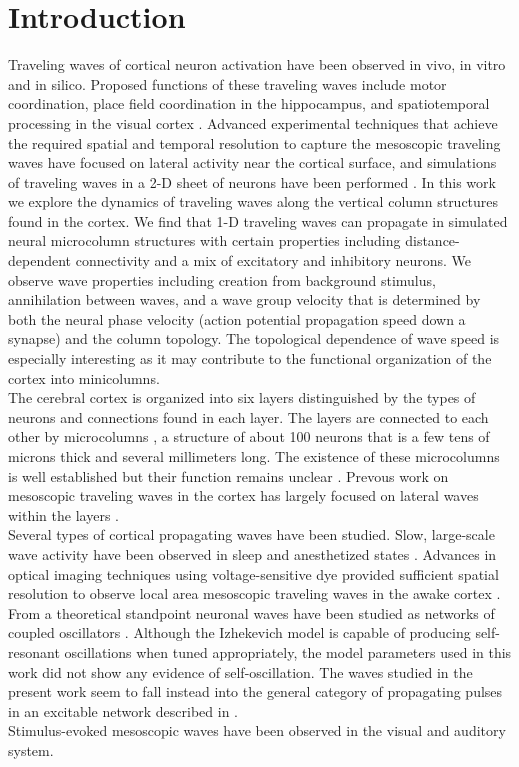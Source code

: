 \documentclass[a4paper,11pt]{article}
\begin{document}
\section{Introduction} 
Traveling waves of cortical neuron activation have been observed in vivo, in vitro and in silico. 
Proposed functions of these traveling waves include motor coordination, place field coordination in the hippocampus, and spatiotemporal processing in the visual cortex \cite{muller2018}. 
Advanced experimental techniques that achieve the required spatial and temporal resolution \cite{shoham1999} to capture the mesoscopic traveling waves have focused on lateral activity near the cortical surface, and simulations of traveling waves in a 2-D sheet of neurons have been performed \cite{keane2015}. 
In this work we explore the dynamics of traveling waves along the vertical column structures found in the cortex.
We find that 1-D traveling waves can propagate in simulated neural microcolumn structures with certain properties including distance-dependent connectivity and a mix of excitatory and inhibitory neurons. 
We observe wave properties including creation from background stimulus, annihilation between waves, and a wave group velocity that is determined by both the neural phase velocity (action potential propagation speed down a synapse) and the column topology. 
The topological dependence of wave speed is especially interesting as it may contribute to the functional organization of the cortex into minicolumns.
\\
The cerebral cortex is organized into six layers distinguished by the types of neurons and connections found in each layer.
The layers are connected to each other by microcolumns \cite{cruz2005}, a structure of about 100 neurons that is a few tens of microns thick and several millimeters long.
The existence of these microcolumns is well established but their function remains unclear \cite{horton2005}. 
Prevous work on mesoscopic traveling waves in the cortex has largely focused on lateral waves within the layers \cite{muller2018}.
\\
Several types of cortical propagating waves have been studied.
Slow, large-scale wave activity have been observed in sleep and anesthetized states \cite{muller2018}.
Advances in optical imaging techniques using voltage-sensitive dye provided sufficient spatial resolution to observe local area mesoscopic traveling waves in the awake cortex \cite{wu2008}.
From a theoretical standpoint neuronal waves have been studied as networks of coupled oscillators \cite{ermentrout2001}. 
Although the Izhekevich model is capable of producing self-resonant oscillations when tuned appropriately, the model parameters used in this work did not show any evidence of self-oscillation.
The waves studied in the present work seem to fall instead into the general category of propagating pulses in an excitable network described in \cite{ermentrout2001}. \\
Stimulus-evoked mesoscopic waves have been observed in the visual and auditory system. 
\end{document}
